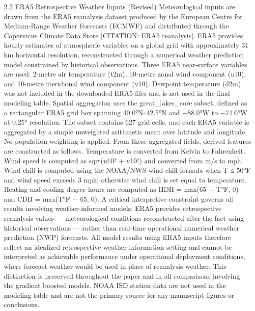 2.2 ERA5 Retrospective Weather Inputs (Revised)
Meteorological inputs are drawn from the ERA5 reanalysis dataset produced by the European Centre for Medium-Range Weather Forecasts (ECMWF) and distributed through the Copernicus Climate Data Store [CITATION: ERA5 reanalysis]. ERA5 provides hourly estimates of atmospheric variables on a global grid with approximately 31 km horizontal resolution, reconstructed through a numerical weather prediction model constrained by historical observations.
Three ERA5 near-surface variables are used: 2-metre air temperature (t2m), 10-metre zonal wind component (u10), and 10-metre meridional wind component (v10). Dewpoint temperature (d2m) was not included in the downloaded ERA5 files and is not used in the final modeling table.
Spatial aggregation uses the great_lakes_core subset, defined as a rectangular ERA5 grid box spanning 40.0°N–42.5°N and −88.0°W to −74.0°W at 0.25° resolution. The subset contains 627 grid cells, and each ERA5 variable is aggregated by a simple unweighted arithmetic mean over latitude and longitude. No population weighting is applied.
From these aggregated fields, derived features are constructed as follows. Temperature is converted from Kelvin to Fahrenheit. Wind speed is computed as sqrt(u10² + v10²) and converted from m/s to mph. Wind chill is computed using the NOAA/NWS wind chill formula when T ≤ 50°F and wind speed exceeds 3 mph; otherwise wind chill is set equal to temperature. Heating and cooling degree hours are computed as HDH = max(65 − T°F, 0) and CDH = max(T°F − 65, 0).
A critical interpretive constraint governs all results involving weather-informed models. ERA5 provides retrospective reanalysis values — meteorological conditions reconstructed after the fact using historical observations — rather than real-time operational numerical weather prediction (NWP) forecasts. All model results using ERA5 inputs therefore reflect an idealized retrospective weather-information setting and cannot be interpreted as achievable performance under operational deployment conditions, where forecast weather would be used in place of reanalysis weather. This distinction is preserved throughout the paper and in all comparisons involving the gradient boosted models.
NOAA ISD station data are not used in the modeling table and are not the primary source for any manuscript figures or conclusions.

